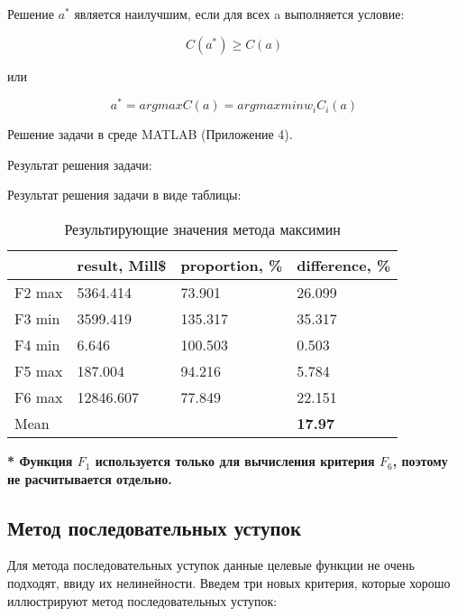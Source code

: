 Решение $a^*$ является наилучшим, если для всех a выполняется условие:

\begin{equation*}
\text{$C(a^*)\geq C(a)$}
\end{equation*}

или

\begin{equation*}
\text{$a^*=arg max C(a)=arg max min w_iC_i(a)$}
\end{equation*}

Решение задачи в среде MATLAB (Приложение 4).

Результат решения задачи:



Результат решения задачи в виде таблицы:

\begin{table}[h!]
	\centering
	\bgroup
	\captionsetup{singlelinecheck = false, format= hang, justification=raggedleft, font=footnotesize, labelsep=space}
	\caption{Результирующие значения метода максимин}
	\def\arraystretch{1}
	\begin{tabular}{ | m{1.5cm} | m{1.9cm} | m{2.2cm} | m{2.2cm} | }
		\hline
		& result, Mill\$ & proportion, \% & difference, \% \\ \hline
		F2 max & 5364.414 & 73.901 & 26.099 \\ \hline
		F3 min & 3599.419 & 135.317 & 35.317 \\ \hline
		F4 min & 6.646 & 100.503 & 0.503 \\ \hline
		F5 max & 187.004 & 94.216 & 5.784 \\ \hline
		F6 max & 12846.607 & 77.849 & 22.151 \\ \hline
		Mean & & & \textbf{17.97} \\
		\hline
	\end{tabular}
	\egroup
\end{table}

\textbf{* Функция $F_1$ используется только для вычисления критерия $F_6$, поэтому не расчитывается отдельно.}

\subsection{Метод последовательных уступок}

Для метода последовательных уступок данные целевые функции не очень подходят, ввиду их нелинейности. Введем три новых критерия, которые хорошо иллюстрируют метод последовательных уступок:

